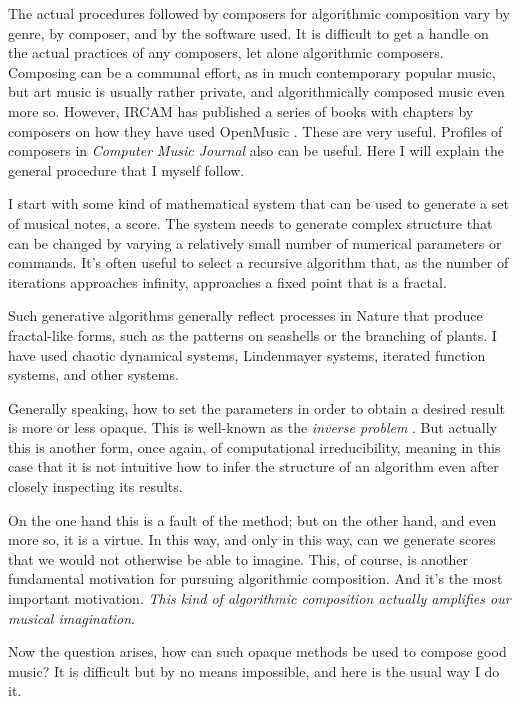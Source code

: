\documentclass[11pt]{scrartcl}
\begin{document}
The actual procedures followed by composers for algorithmic composition vary by genre, by composer, and by the software used. It is difficult to get a handle on the actual practices of any composers, let alone algorithmic composers. Composing can be a communal effort, as in much contemporary popular music, but art music is usually rather private, and algorithmically composed music even more so. However, IRCAM has published a series of books with chapters by composers on how they have used OpenMusic \parencite{omcomposersbook, agon2006om, agon2008om, agon2016om}. These are very useful. Profiles of composers in \emph{Computer Music Journal} also can be useful. Here I will explain the general procedure that I myself follow.

I start with some kind of mathematical system that can be used to generate a set of musical notes, a score. The system needs to generate complex structure that can be changed by varying a relatively small number of numerical parameters or commands. It’s often useful to select a recursive algorithm that, as the number of iterations approaches infinity, approaches a fixed point that is a fractal.

Such generative algorithms generally reflect processes in Nature that produce fractal-like forms, such as the patterns on seashells or the branching of plants. I have used chaotic dynamical systems, Lindenmayer systems, iterated function systems, and other systems.

Generally speaking, how to set the parameters in order to obtain a desired result is more or less opaque. This is well-known as the \emph{inverse problem} \parencite{graham2021applying, tu2023learning}. But actually this is another form, once again, of computational irreducibility, meaning in this case that it is not intuitive how to infer the structure of an algorithm even after closely inspecting its results. 

On the one hand this is a fault of the method; but on the other hand, and even more so, it is a virtue. In this way, and only in this way, can we generate scores that we would not otherwise be able to imagine. This, of course, is another fundamental motivation for pursuing algorithmic composition. And it's the most important motivation. \emph{This kind of algorithmic composition actually amplifies our musical imagination}.

Now the question arises, how can such opaque methods be used to compose good music? It is difficult but by no means impossible, and here is the usual way I do it.
\end{document}
